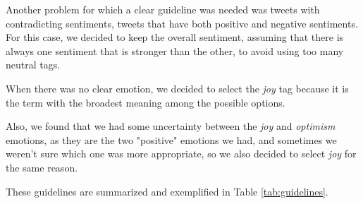 \documentclass[11pt,a4paper]{article}
\begin{document}
Another problem for which a clear guideline was needed was tweets with contradicting sentiments, tweets that have both positive and negative sentiments. For this case, we decided to keep the overall sentiment, assuming that there is always one sentiment that is stronger than the other, to avoid using too many neutral tags.

When there was no clear emotion, we decided to select the \textit{joy} tag because it is the term with the broadest meaning among the possible options. 

Also, we found that we had some uncertainty between the \textit{joy} and \textit{optimism} emotions, as they are the two "positive" emotions we had, and sometimes we weren't sure which one was more appropriate, so we also decided to select \textit{joy} for the same reason.

These guidelines are summarized and exemplified in Table \ref{tab:guidelines}.
\end{document}
